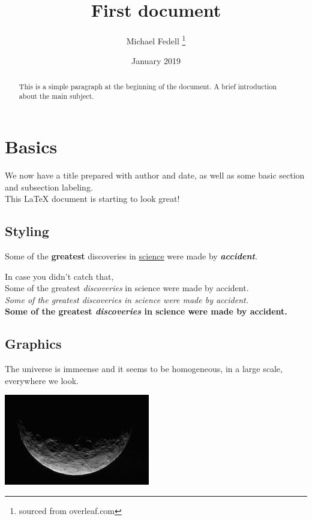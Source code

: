 \documentclass[12pt, letterpaper]{article}
\title{First document}
\author{Michael Fedell \thanks{sourced from overleaf.com}}
\date{January 2019}
\begin{document}
\maketitle
\tableofcontents

\newpage

\begin{abstract}
    This is a simple paragraph at the beginning of the
    document. A brief introduction about the main subject.
\end{abstract}

\section{Basics}

We now have a title prepared with author and date, as well as some basic section and subsection labeling.
\\
This \LaTeX{} document is starting to look great!

\subsection{Styling}
Some of the \textbf{greatest}
discoveries in \underline{science}
were made by \textbf{\textit{accident}}.

\vspace{10mm}

In case you didn't catch that,
\medskip\\
Some of the greatest \emph{discoveries}
in science
were made by accident.
\\
\textit{Some of the greatest \emph{discoveries}
in science
were made by accident.}
\\
\textbf{Some of the greatest \emph{discoveries}
in science
were made by accident.}

\subsection{Graphics}
The universe is immeense and it seems to be homogeneous, in a large scale, everywhere we look.

\smallskip
\includegraphics{moon}
\end{document}
